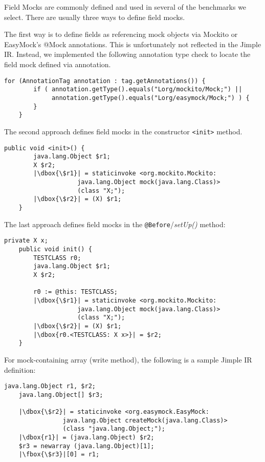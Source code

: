 Field Mocks are commonly defined and used in several of the benchmarks we select. There are usually three ways to define field mocks. 

The first way is to define fields as referencing mock objects via Mockito or EasyMock's @Mock annotations. This is unfortunately not reflected in the Jimple IR. Instead, we implemented the following annotation type check to locate the field mock defined via annotation.

\begin{lstlisting}[basicstyle=\linespread{1.0}\ttfamily\small,numbers=none,escapechar={|}]
	for (AnnotationTag annotation : tag.getAnnotations()) {
		if ( annotation.getType().equals("Lorg/mockito/Mock;") ||
			 annotation.getType().equals("Lorg/easymock/Mock;") ) {
		}
	}
\end{lstlisting}

The second approach defines field mocks in the constructor \texttt{<init>} method.

\begin{lstlisting}[basicstyle=\linespread{1.0}\ttfamily\small,numbers=none,escapechar={|}]
	public void <init>() {
		java.lang.Object $r1;
		X $r2;
		|\dbox{\$r1}| = staticinvoke <org.mockito.Mockito:
					java.lang.Object mock(java.lang.Class)>
					(class "X;");
		|\dbox{\$r2}| = (X) $r1;
	}
\end{lstlisting}

The last approach defines field mocks in the \texttt{@Before}/\textit{setUp()} method:

\begin{lstlisting}[basicstyle=\linespread{1.0}\ttfamily\small,numbers=none,escapechar={|}]
	private X x;
	public void init() {
		TESTCLASS r0;
		java.lang.Object $r1;
		X $r2;
		
		r0 := @this: TESTCLASS;
		|\dbox{\$r1}| = staticinvoke <org.mockito.Mockito:
					java.lang.Object mock(java.lang.Class)>
					(class "X;");
		|\dbox{\$r2}| = (X) $r1;
		|\dbox{r0.<TESTCLASS: X x>}| = $r2;
	}
\end{lstlisting}

For mock-containing array (write method), the following is a sample Jimple IR definition:

\begin{lstlisting}[basicstyle=\linespread{1.0}\ttfamily\small,numbers=none,escapechar={|}]
	java.lang.Object r1, $r2;
	java.lang.Object[] $r3;
	
	|\dbox{\$r2}| = staticinvoke <org.easymock.EasyMock:
				java.lang.Object createMock(java.lang.Class)>
				(class "java.lang.Object;");
	|\dbox{r1}| = (java.lang.Object) $r2;
	$r3 = newarray (java.lang.Object)[1];
	|\fbox{\$r3}|[0] = r1;
\end{lstlisting}

